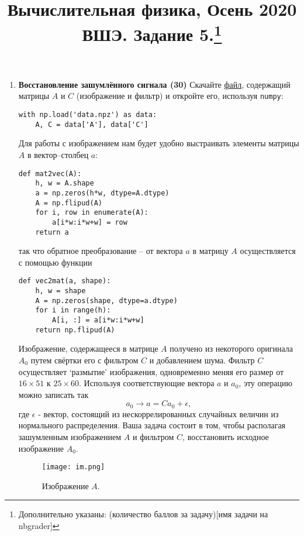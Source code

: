 \documentclass[prb,papersize=a4paper,notitlepage]{revtex4-1}%
\begin{document}
\title{Вычислительная физика, Осень 2020 ВШЭ. Задание 5.\footnote{Дополнительно указаны: (количество баллов за задачу)[имя задачи на nbgrader]}}
\maketitle
\begin{enumerate}
\item \textbf{Восстановление зашумлённого сигнала (30)} Скачайте \href{https://www.dropbox.com/s/qgz1x67t10fd7hf/data.npz?dl=0}{файл}, содержащий матрицы $A$ и $C$ (изображение и фильтр) и откройте его, используя \lstinline{numpy}:
\lstset{language=Python}
\lstset{frame=lines}
\lstset{basicstyle=\ttfamily}
\begin{lstlisting}
with np.load('data.npz') as data:
    A, C = data['A'], data['C']
\end{lstlisting}
Для работы с изображением нам будет удобно выстраивать элементы матрицы $A$ в вектор--столбец $a$:
\lstset{language=Python}
\lstset{frame=lines}
\lstset{basicstyle=\ttfamily}
\begin{lstlisting}
def mat2vec(A):
    h, w = A.shape
    a = np.zeros(h*w, dtype=A.dtype)
    A = np.flipud(A) 
    for i, row in enumerate(A):
        a[i*w:i*w+w] = row
    return a
\end{lstlisting}
так что обратное преобразование -- от вектора $a$ в матрицу $A$ осуществляется с помощью функции
\lstset{language=Python}
\lstset{frame=lines}
\lstset{basicstyle=\ttfamily}
\begin{lstlisting}
def vec2mat(a, shape):
    h, w = shape
    A = np.zeros(shape, dtype=a.dtype)
    for i in range(h):
        A[i, :] = a[i*w:i*w+w]
    return np.flipud(A)
\end{lstlisting}
Изображение, содержащееся в матрице $A$ получено из некоторого оригинала $A_0$ путем свёртки его с фильтром $C$ и добавлением шума. Фильтр $C$ осуществляет `размытие' изображения, одновременно меняя его размер от $16\times 51$ к $25\times 60$. Используя соответствующие вектора $a$ и $a_0$, эту операцию можно записать так
$$
a_0\to a = C a_0 + \epsilon,
$$
где $\epsilon$ - вектор, состоящий из нескоррелированных случайных величин из нормального распределения. Ваша задача состоит в том, чтобы располагая зашумленным изображением $A$ и фильтром $C$, восстановить исходное изображение $A_0$.
\begin{figure}[h!]
\texttt{[image: im.png]}
\caption{Изображение $A$.}

\end{figure}
\end{enumerate}
\end{document}
